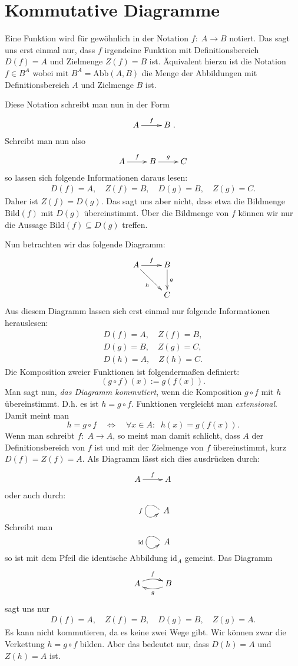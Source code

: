 \documentclass[a4paper,11pt,fleqn,BCOR=20mm,%
twoside,twocolumn,dvipdfmx]{scrartcl}
\begin{document}
\section*{Kommutative Diagramme}

Eine Funktion wird für gewöhnlich in der Notation
$f{:}\;A\rightarrow B$ notiert. Das sagt uns erst einmal nur,
dass $f$ irgendeine Funktion mit Definitionsbereich
$D(f)=A$ und Zielmenge $Z(f)=B$ ist. Äquivalent hierzu ist
die Notation $f{\in}B^A$ wobei mit
$B^A=\mathrm{Abb}(A,B)$ die Menge der Abbildungen mit
Definitionsbereich $A$ und Zielmenge $B$ ist.

Diese Notation schreibt man nun in der Form%
\[\xymatrix{A \ar[r]^f & B}.\]
Schreibt man nun also
\[\xymatrix{A \ar[r]^f & B \ar[r]^g & C}\]
so lassen sich folgende Informationen daraus lesen:%
\begin{gather*}
D(f)=A,\quad Z(f)=B,\quad D(g)=B,\quad Z(g)=C.
\end{gather*}
Daher ist $Z(f)=D(g)$. Das sagt uns aber nicht, dass etwa die
Bildmenge $\mathrm{Bild}(f)$ mit $D(g)$ übereinstimmt.
Über die Bildmenge von $f$ können wir nur die Aussage
$\mathrm{Bild}(f)\subseteq D(g)$ treffen.

Nun betrachten wir das folgende Diagramm:%
\[\xymatrix{A \ar[r]^f \ar[dr]_h & B\ar[d]^g\\
& C}
\]
Aus diesem Diagramm lassen sich erst einmal nur folgende
Informationen herauslesen:%
\begin{gather*}
D(f)=A,\quad Z(f)=B,\\
D(g)=B,\quad Z(g)=C,\\
D(h)=A,\quad Z(h)=C.
\end{gather*}
Die Komposition zweier Funktionen ist folgendermaßen definiert:%
\[(g\circ f)(x):=g(f(x)).\]
Man sagt nun, \textit{das Diagramm kommutiert}, wenn die Komposition
$g\circ f$ mit $h$ übereinstimmt. D.h. es ist $h=g\circ f$.
Funktionen vergleicht man \textit{extensional}. Damit meint man%
\[h=g\circ f \quad\Longleftrightarrow\quad \forall x{\in}A{:}\;\;
h(x)=g(f(x)).\]
Wenn man schreibt $f{:}\; A\rightarrow A$, so meint man damit
schlicht, dass $A$ der Definitionsbereich von $f$ ist und
mit der Zielmenge von $f$ übereinstimmt, kurz $D(f)=Z(f)=A$.
Als Diagramm lässt sich dies ausdrücken durch:%
\[\xymatrix{A\ar[r]^f & A}\]
oder auch durch:
\[\xymatrix{\ar@(ul,dl)_f}A\]
Schreibt man
\[\xymatrix{\ar@(ul,dl)_{\mathrm{id}}}A\]
so ist mit dem Pfeil die identische Abbildung $\mathrm{id}_A$
gemeint. Das Diagramm%
\[\xymatrix{A \ar@/^/[r]^f & \ar@/^/[l]^g B}\]
sagt uns nur
\begin{gather*}
D(f)=A,\quad Z(f)=B,\quad D(g)=B,\quad Z(g)=A.
\end{gather*}
Es kann nicht kommutieren, da es keine zwei Wege gibt.
Wir können zwar die Verkettung $h=g\circ f$ bilden. Aber das
bedeutet nur, dass $D(h)=A$ und $Z(h)=A$ ist.
\end{document}
